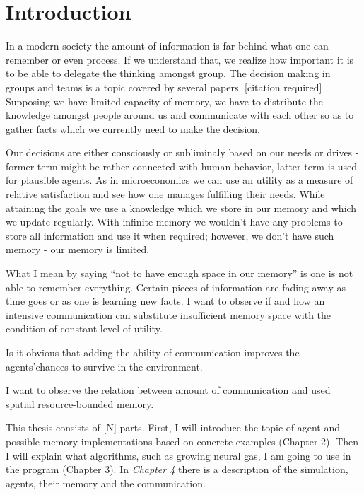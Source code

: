 \chapter{Introduction}

In a modern society the amount of information is far behind what one can remember or even process. If we understand that, we realize how important it is to be able to delegate the thinking amongst group. The decision making in groups and teams is a topic covered by several papers. [citation required] Supposing we have limited capacity of memory, we have to distribute the knowledge amongst people around us and communicate with each other so as to gather facts which we currently need to make the decision. 

Our decisions are either consciously or subliminaly based on our needs or drives - former term might be rather connected with human behavior, latter term is used for plausible agents. As in microeconomics we can use an utility as a measure of relative satisfaction \cite{Varian:micro} and see how one manages fulfilling their needs. While attaining the goals we use a knowledge which we store in our memory and which we update regularly. With infinite memory we wouldn’t have any problems to store all information and use it when required; however, we don’t have such memory - our memory is limited. 

What I mean by saying “not to have enough space in our memory” is one is not able to remember everything. Certain pieces of information are fading away as time goes or as one is learning new facts. I want to observe if and how an intensive communication can substitute insufficient memory space with the condition of constant level of utility.

Is it obvious that adding the ability of communication improves the agents'chances to survive in the environment.

I want to observe the relation between amount of communication and used spatial resource-bounded memory. 

This thesis consists of [N] parts. First, I will introduce the topic of agent and possible memory implementations based on concrete examples (Chapter 2). Then I will explain what algorithms, such as growing neural gas, I am going to use in the program (Chapter 3). In \emph{Chapter 4} there is a description of the simulation, agents, their memory and the communication.